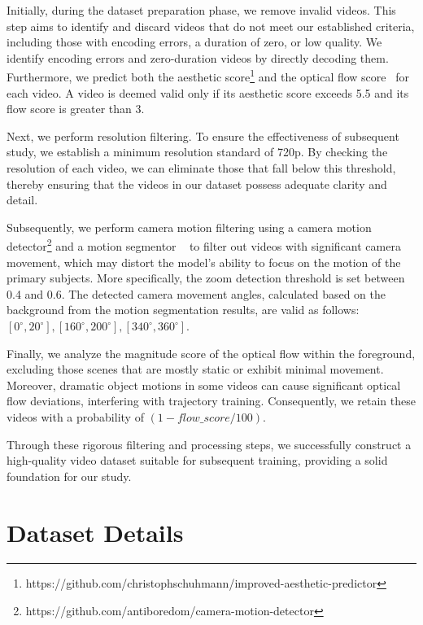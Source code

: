 Initially, during the dataset preparation phase, we remove invalid videos. This step aims to identify and discard videos that do not meet our established criteria, including those with encoding errors, a duration of zero, or low quality. We identify encoding errors and zero-duration videos by directly decoding them. Furthermore, we predict both the aesthetic score\footnote{https://github.com/christophschuhmann/improved-aesthetic-predictor} and the optical flow score~\cite{DBLP:journals/pami/XuZCRYTG23} for each video. A video is deemed valid only if its aesthetic score exceeds 5.5 and its flow score is greater than 3.

Next, we perform resolution filtering. To ensure the effectiveness of subsequent study, we establish a minimum resolution standard of 720p. By checking the resolution of each video, we can eliminate those that fall below this threshold, thereby ensuring that the videos in our dataset possess adequate clarity and detail.


Subsequently, we perform camera motion filtering using a camera motion detector\footnote{https://github.com/antiboredom/camera-motion-detector} and a motion segmentor ~\cite{DBLP:conf/eccv/ZhaoLGWL22} to filter out videos with significant camera movement, which may distort the model's ability to focus on the motion of the primary subjects. More specifically, the zoom detection threshold is set between 0.4 and 0.6. The detected camera movement angles, calculated based on the background from the motion segmentation results, are valid as follows:$[0^{\circ}, 20^{\circ}], [160^{\circ}, 200^{\circ}], [340^{\circ}, 360^{\circ}]$. 

Finally, we analyze the magnitude score of the optical flow within the foreground, excluding those scenes that are mostly static or exhibit minimal movement. Moreover, dramatic object motions in some videos can cause significant optical flow deviations, interfering with trajectory training. Consequently, we retain these videos with a probability of $(1 - flow\_score / 100)$. 

Through these rigorous filtering and processing steps, we successfully construct a high-quality video dataset suitable for subsequent training, providing a solid foundation for our study.

\section{Dataset Details}\label{sup.data-detail}

